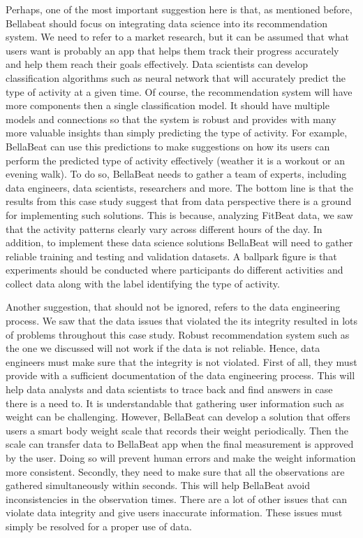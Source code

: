 \documentclass[
]{article}
\begin{document}
Perhaps, one of the most important suggestion here is that, as mentioned
before, Bellabeat should focus on integrating data science into its
recommendation system. We need to refer to a market research, but it can
be assumed that what users want is probably an app that helps them track
their progress accurately and help them reach their goals effectively.
Data scientists can develop classification algorithms such as neural
network that will accurately predict the type of activity at a given
time. Of course, the recommendation system will have more components
then a single classification model. It should have multiple models and
connections so that the system is robust and provides with many more
valuable insights than simply predicting the type of activity. For
example, BellaBeat can use this predictions to make suggestions on how
its users can perform the predicted type of activity effectively
(weather it is a workout or an evening walk). To do so, BellaBeat needs
to gather a team of experts, including data engineers, data scientists,
researchers and more. The bottom line is that the results from this case
study suggest that from data perspective there is a ground for
implementing such solutions. This is because, analyzing FitBeat data, we
saw that the activity patterns clearly vary across different hours of
the day. In addition, to implement these data science solutions
BellaBeat will need to gather reliable training and testing and
validation datasets. A ballpark figure is that experiments should be
conducted where participants do different activities and collect data
along with the label identifying the type of activity.

Another suggestion, that should not be ignored, refers to the data
engineering process. We saw that the data issues that violated the its
integrity resulted in lots of problems throughout this case study.
Robust recommendation system such as the one we discussed will not work
if the data is not reliable. Hence, data engineers must make sure that
the integrity is not violated. First of all, they must provide with a
sufficient documentation of the data engineering process. This will help
data analysts and data scientists to trace back and find answers in case
there is a need to. It is understandable that gathering user information
such as weight can be challenging. However, BellaBeat can develop a
solution that offers users a smart body weight scale that records their
weight periodically. Then the scale can transfer data to BellaBeat app
when the final measurement is approved by the user. Doing so will
prevent human errors and make the weight information more consistent.
Secondly, they need to make sure that all the observations are gathered
simultaneously within seconds. This will help BellaBeat avoid
inconsistencies in the observation times. There are a lot of other
issues that can violate data integrity and give users inaccurate
information. These issues must simply be resolved for a proper use of
data.
\end{document}
